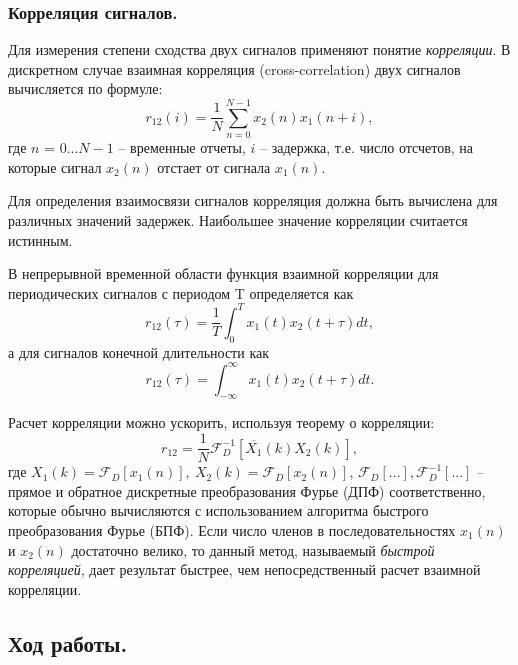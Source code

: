 \documentclass[a4paper,14pt]{extarticle}
\begin{document}
\subsubsection{Корреляция сигналов.}
Для измерения степени сходства двух сигналов применяют понятие
\textit{корреляции}. В дискретном случае взаимная корреляция (cross-correlation) двух сигналов вычисляется по формуле:
\begin{equation*}
r_{12}(i) = \frac{1}{N} \sum^{N-1}_{n=0} x_2(n)x_1(n+i),
\end{equation*}
где $n$ = 0...$N-1$ -- временные отчеты, $i$ -- задержка, т.е. число отсчетов,
на которые сигнал $x_2(n)$ отстает от сигнала $x_1 (n)$.

Для определения взаимосвязи сигналов корреляция должна быть вычислена для различных значений задержек. Наибольшее значение корреляции считается истинным.

В непрерывной временной области функция взаимной корреляции для
периодических сигналов с периодом T определяется как
\begin{equation*}
r_{12}(\tau) = \frac{1}{T} \int^T_0 x_1(t) x_2(t + \tau) dt,
\end{equation*}
а для сигналов конечной длительности как 
\begin{equation*}
r_{12}(\tau) = \int^{\infty}_{-\infty} x_1(t) x_2(t + \tau) dt.
\end{equation*}

Расчет корреляции можно ускорить, используя теорему о корреляции:
\begin{equation*}
r_{12} = \frac{1}{N} \mathcal{F}_D^{-1} [\overline{X_1}(k)X_2(k)],
\end{equation*}
где $X_1(k) = \mathcal{F}_D [x_1(n)],~ X_2(k) = \mathcal{F}_D[x_2(n)]$, $\mathcal{F}_D[...], \mathcal{F}_D^{-1}[...]$ -- прямое и
обратное дискретные преобразования Фурье (ДПФ) соответственно, которые
обычно вычисляются с использованием алгоритма быстрого преобразования
Фурье (БПФ). Если число членов в последовательностях $x_1 (n)$ и $x_2(n)$ достаточно велико, то данный метод, называемый \textit{быстрой корреляцией}, дает результат быстрее, чем непосредственный расчет взаимной корреляции.

\subsection{Ход работы.}
\end{document}
